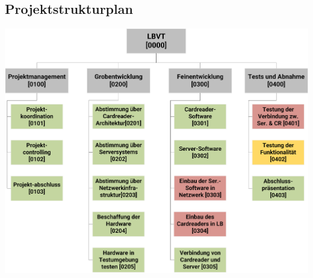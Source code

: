 \subsection{Projektstrukturplan} 
\includegraphics[width=\textwidth]{images/PSP/PSP14.png}

\newpage 


